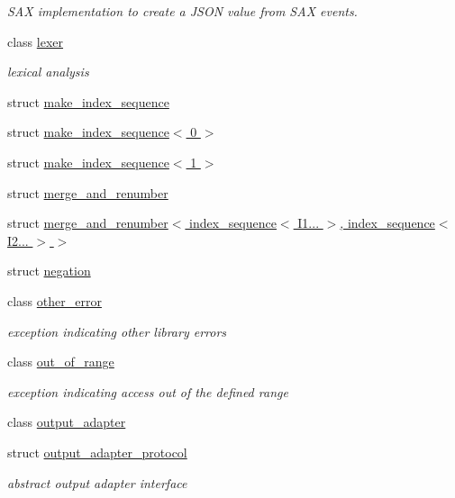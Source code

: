\begin{DoxyCompactItemize}
\begin{DoxyCompactList}\small\item\em S\+AX implementation to create a J\+S\+ON value from S\+AX events. \end{DoxyCompactList}\item 
class \hyperlink{classnlohmann_1_1detail_1_1lexer}{lexer}
\begin{DoxyCompactList}\small\item\em lexical analysis \end{DoxyCompactList}\item 
struct \hyperlink{structnlohmann_1_1detail_1_1make__index__sequence}{make\+\_\+index\+\_\+sequence}
\item 
struct \hyperlink{structnlohmann_1_1detail_1_1make__index__sequence_3_010_01_4}{make\+\_\+index\+\_\+sequence$<$ 0 $>$}
\item 
struct \hyperlink{structnlohmann_1_1detail_1_1make__index__sequence_3_011_01_4}{make\+\_\+index\+\_\+sequence$<$ 1 $>$}
\item 
struct \hyperlink{structnlohmann_1_1detail_1_1merge__and__renumber}{merge\+\_\+and\+\_\+renumber}
\item 
struct \hyperlink{structnlohmann_1_1detail_1_1merge__and__renumber_3_01index__sequence_3_01_i1_8_8_8_01_4_00_01indf5ec8c9c7b5107e4b381e3ca4c1be2ca}{merge\+\_\+and\+\_\+renumber$<$ index\+\_\+sequence$<$ I1... $>$, index\+\_\+sequence$<$ I2... $>$ $>$}
\item 
struct \hyperlink{structnlohmann_1_1detail_1_1negation}{negation}
\item 
class \hyperlink{classnlohmann_1_1detail_1_1other__error}{other\+\_\+error}
\begin{DoxyCompactList}\small\item\em exception indicating other library errors \end{DoxyCompactList}\item 
class \hyperlink{classnlohmann_1_1detail_1_1out__of__range}{out\+\_\+of\+\_\+range}
\begin{DoxyCompactList}\small\item\em exception indicating access out of the defined range \end{DoxyCompactList}\item 
class \hyperlink{classnlohmann_1_1detail_1_1output__adapter}{output\+\_\+adapter}
\item 
struct \hyperlink{structnlohmann_1_1detail_1_1output__adapter__protocol}{output\+\_\+adapter\+\_\+protocol}
\begin{DoxyCompactList}\small\item\em abstract output adapter interface \end{DoxyCompactList}\item 

\end{DoxyCompactItemize}
